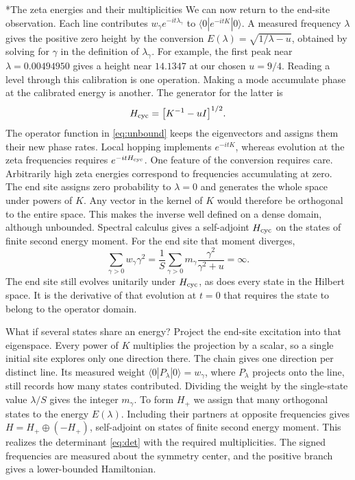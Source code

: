 \documentclass[11pt,letterpaper]{article}
\makeatletter
\renewcommand\subsection{\@startsection{subsection}{2}{\z@}{-2.0ex plus -.3ex}{.75ex}{\normalfont\normalsize\itshape}}
\numberwithin{equation}{section}
\makeatother
\begin{document}
\subsection*{The zeta energies and their multiplicities}
We can now return to the end-site observation. Each line contributes $w_\gamma e^{-it\lambda_\gamma}$ to $\langle0|e^{-itK}|0\rangle$. A measured frequency $\lambda$ gives the positive zero height by the conversion $E(\lambda)=\sqrt{1/\lambda-u}$, obtained by solving for $\gamma$ in the definition of $\lambda_\gamma$. For example, the first peak near $\lambda=0.00494950$ gives a height near $14.1347$ at our chosen $u=9/4$. Reading a level through this calibration is one operation. Making a mode accumulate phase at the calibrated energy is another. The generator for the latter is
\begin{equation}
 H_{\rm cyc}=\bigl[K^{-1}-uI\bigr]^{1/2}.
 \label{eq:unbound}
\end{equation}
The operator function in \eqref{eq:unbound} keeps the eigenvectors and assigns them their new phase rates. Local hopping implements $e^{-itK}$, whereas evolution at the zeta frequencies requires $e^{-itH_{\rm cyc}}$. One feature of the conversion requires care. Arbitrarily high zeta energies correspond to frequencies accumulating at zero. The end site assigns zero probability to $\lambda=0$ and generates the whole space under powers of $K$. Any vector in the kernel of $K$ would therefore be orthogonal to the entire space. This makes the inverse well defined on a dense domain, although unbounded. Spectral calculus gives a self-adjoint $H_{\rm cyc}$ on the states of finite second energy moment. For the end site that moment diverges,
\[
 \sum_{\gamma>0}w_\gamma\gamma^2
   =\frac1S\sum_{\gamma>0}m_\gamma\frac{\gamma^2}{\gamma^2+u}=\infty .
\]
The end site still evolves unitarily under $H_{\rm cyc}$, as does every state in the Hilbert space. It is the derivative of that evolution at $t=0$ that requires the state to belong to the operator domain.

What if several states share an energy? Project the end-site excitation into that eigenspace. Every power of $K$ multiplies the projection by a scalar, so a single initial site explores only one direction there. The chain gives one direction per distinct line. Its measured weight $\langle0|P_\lambda|0\rangle=w_\gamma$, where $P_\lambda$ projects onto the line, still records how many states contributed. Dividing the weight by the single-state value $\lambda/S$ gives the integer $m_\gamma$. To form $H_+$ we assign that many orthogonal states to the energy $E(\lambda)$. Including their partners at opposite frequencies gives $H=H_+\oplus(-H_+)$, self-adjoint on states of finite second energy moment. This realizes the determinant \eqref{eq:det} with the required multiplicities. The signed frequencies are measured about the symmetry center, and the positive branch gives a lower-bounded Hamiltonian.
\end{document}

